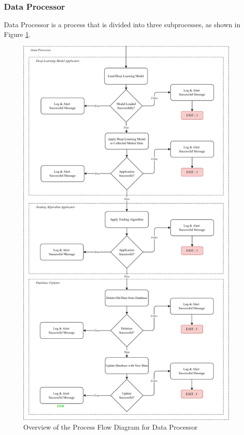 \subsubsection{Data Processor}
\label{subsubsec:ml_application}
Data Processor is a process that is divided into three subprocesses, as shown in 
Figure \ref{fig:process_flowchart_data_processor}.
\begin{figure}[ht]
    \centering
    \includegraphics[height=0.8\textheight]{./assets/Chapter_3/PFC/ProcessFlowchart_DataProcessor.png}
    \caption{Overview of the Process Flow Diagram for Data Processor}
    \label{fig:process_flowchart_data_processor}
\end{figure}
\FloatBarrier

